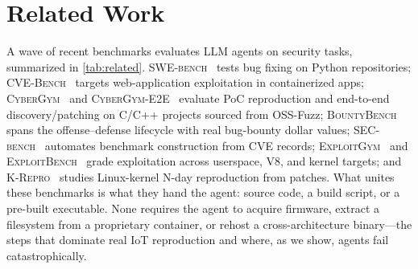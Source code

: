 \section{Related Work}
\label{sec:related}

A wave of recent benchmarks evaluates LLM agents on security tasks, summarized in \cref{tab:related}. \textsc{SWE-bench}~\cite{jimenez2024swebench} tests bug fixing on Python repositories; \textsc{CVE-Bench}~\cite{cvebench} targets web-application exploitation in containerized apps; \textsc{CyberGym}~\cite{wang2025cybergym} and \textsc{CyberGym-E2E}~\cite{cybergyme2e} evaluate PoC reproduction and end-to-end discovery/patching on C/C++ projects sourced from OSS-Fuzz; \textsc{BountyBench}~\cite{zhang2025bountybench} spans the offense--defense lifecycle with real bug-bounty dollar values; \textsc{SEC-bench}~\cite{secbench} automates benchmark construction from CVE records; \textsc{ExploitGym}~\cite{exploitgym} and \textsc{ExploitBench}~\cite{exploitbench} grade exploitation across userspace, V8, and kernel targets; and \textsc{K-Repro}~\cite{krepror} studies Linux-kernel N-day reproduction from patches. What unites these benchmarks is what they hand the agent: source code, a build script, or a pre-built executable. None requires the agent to acquire firmware, extract a filesystem from a proprietary container, or rehost a cross-architecture binary---the steps that dominate real IoT reproduction and where, as we show, agents fail catastrophically.

